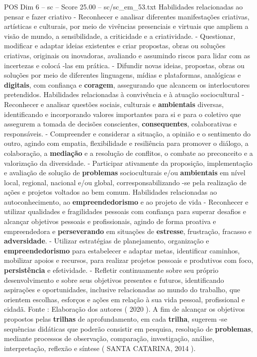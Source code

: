 \begin{textsample}{POS Dim 6 – sc – Score 25.00 – sc/sc\_em\_53.txt}
Habilidades relacionadas ao pensar e fazer criativo - Reconhecer e analisar diferentes manifestações criativas, artísticas e culturais, por meio de vivências presenciais e virtuais que ampliem a visão de mundo, a sensibilidade, a criticidade e a criatividade. - Questionar, modificar e adaptar ideias existentes e criar propostas, obras ou soluções criativas, originais ou inovadoras, avaliando e assumindo riscos para lidar com as incertezas e colocá -las em prática. - Difundir novas ideias, propostas, obras ou soluções por meio de diferentes linguagens, mídias e plataformas, analógicas e \textbf{digitais}, com confiança e \textbf{coragem}, assegurando que alcancem os interlocutores pretendidos.
Habilidades relacionadas à convivência e à atuação sociocultural - Reconhecer e analisar questões sociais, culturais e \textbf{ambientais} diversas, identificando e incorporando valores importantes para si e para o coletivo que assegurem a tomada de decisões conscientes, \textbf{consequentes}, colaborativas e responsáveis. - Compreender e considerar a situação, a opinião e o sentimento do outro, agindo com empatia, flexibilidade e resiliência para promover o diálogo, a colaboração, a \textbf{mediação} e a resolução de conflitos, o combate ao preconceito e a valorização da diversidade. - Participar ativamente da proposição, implementação e avaliação de solução de \textbf{problemas} socioculturais e/ou \textbf{ambientais} em nível local, regional, nacional e/ou global, corresponsabilizando -se pela realização de ações e projetos voltados ao bem comum.
Habilidades relacionadas ao autoconhecimento, ao \textbf{empreendedorismo} e ao projeto de vida - Reconhecer e utilizar qualidades e fragilidades pessoais com confiança para superar desafios e alcançar objetivos pessoais e profissionais, agindo de forma proativa e empreendedora e \textbf{perseverando} em situações de \textbf{estresse}, frustração, fracasso e \textbf{adversidade}. - Utilizar estratégias de planejamento, organização e \textbf{empreendedorismo} para estabelecer e adaptar metas, identificar caminhos, mobilizar apoios e recursos, para realizar projetos pessoais e produtivos com foco, \textbf{persistência} e efetividade. - Refletir continuamente sobre seu próprio desenvolvimento e sobre seus objetivos presentes e futuros, identificando aspirações e oportunidades, inclusive relacionadas ao mundo do trabalho, que orientem escolhas, esforços e ações em relação à sua vida pessoal, profissional e cidadã.
Fonte : Elaboração dos autores ( 2020 ).
A fim de alcançar os objetivos propostos pelas \textbf{trilhas} de aprofundamento, em cada \textbf{trilha}, sugerem -se sequências didáticas que poderão consistir em pesquisa, resolução de \textbf{problemas}, mediante processos de observação, comparação, investigação, análise, interpretação, reflexão e síntese ( SANTA CATARINA, 2014 ).

\end{textsample}
